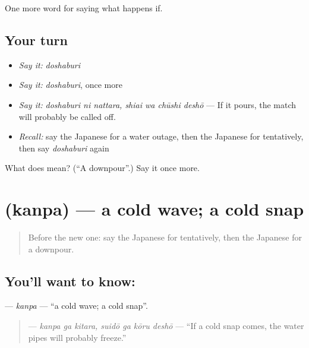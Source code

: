 \begin{grammarlens}[title={What you've built}]
One more word for saying what happens if.
\end{grammarlens}

\subsection*{Your turn}
\begin{itemize}
\raggedright
  \item \emph{Say it:} \emph{doshaburi}
  \item \emph{Say it:} \emph{doshaburi}, once more
  \item \emph{Say it:} \emph{doshaburi ni nattara, shiai wa chūshi deshō} — If it pours, the match will probably be called off.
  \item \emph{Recall:} say the Japanese for a water outage, then the Japanese for tentatively, then say \emph{doshaburi} again
\end{itemize}

\begin{tcolorbox}[breakable,colback=teal!4,colframe=teal!35!black,title={Before you move on}]
What does  mean? (\textquotedblleft{}A downpour\textquotedblright{}.) Say it once more.
\end{tcolorbox}
\section[\texorpdfstring{\ja{かんぱ} (kanpa)}{かんぱ (kanpa)}]{ (kanpa) — a cold wave; a cold snap}

\label{lesson:JA-C354-kanpa}



\begin{quote}
Before the new one: say the Japanese for tentatively, then the Japanese for a downpour.
\end{quote}

\subsection*{You'll want to know: }
\textbf{} — \emph{kanpa} — \textquotedblleft{}a cold wave; a cold snap\textquotedblright{}.

\begin{quote}
\textbf{  } — \emph{kanpa ga kitara, suidō ga kōru deshō} — \textquotedblleft{}If a cold snap comes, the water pipes will probably freeze.\textquotedblright{}
\end{quote}

